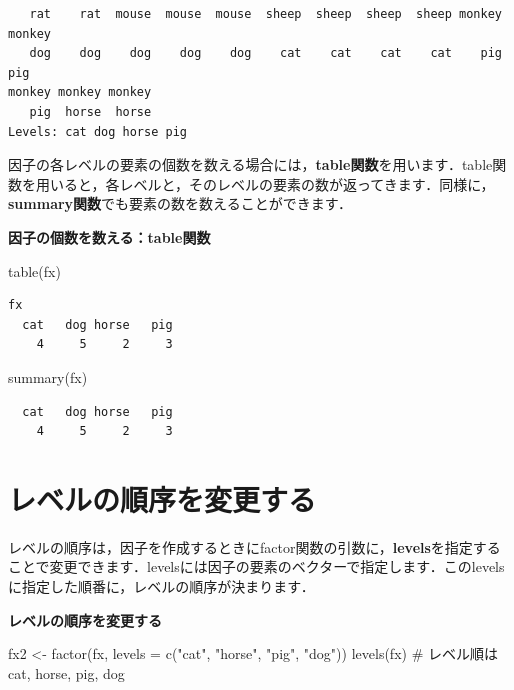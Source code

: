 \documentclass[
  letterpaper,
  DIV=11,
  numbers=noendperiod]{scrreprt}
\newenvironment{Shaded}{\begin{snugshade}}{\end{snugshade}}
\newcommand{\AttributeTok}[1]{\textcolor[rgb]{0.40,0.45,0.13}{#1}}
\newcommand{\CommentTok}[1]{\textcolor[rgb]{0.37,0.37,0.37}{#1}}
\newcommand{\FunctionTok}[1]{\textcolor[rgb]{0.28,0.35,0.67}{#1}}
\newcommand{\NormalTok}[1]{\textcolor[rgb]{0.00,0.23,0.31}{#1}}
\newcommand{\OtherTok}[1]{\textcolor[rgb]{0.00,0.23,0.31}{#1}}
\newcommand{\StringTok}[1]{\textcolor[rgb]{0.13,0.47,0.30}{#1}}
\begin{document}
\begin{verbatim}
   rat    rat  mouse  mouse  mouse  sheep  sheep  sheep  sheep monkey monkey 
   dog    dog    dog    dog    dog    cat    cat    cat    cat    pig    pig 
monkey monkey monkey 
   pig  horse  horse 
Levels: cat dog horse pig
\end{verbatim}

因子の各レベルの要素の個数を数える場合には，\textbf{table関数}を用います．table関数を用いると，各レベルと，そのレベルの要素の数が返ってきます．同様に，\textbf{summary関数}でも要素の数を数えることができます．

\textbf{因子の個数を数える：table関数}

\begin{Shaded}
\begin{Highlighting}[]
\FunctionTok{table}\NormalTok{(fx)}
\end{Highlighting}
\end{Shaded}

\begin{verbatim}
fx
  cat   dog horse   pig 
    4     5     2     3 
\end{verbatim}

\begin{Shaded}
\begin{Highlighting}[]
\FunctionTok{summary}\NormalTok{(fx)}
\end{Highlighting}
\end{Shaded}

\begin{verbatim}
  cat   dog horse   pig 
    4     5     2     3 
\end{verbatim}

\hypertarget{ux30ecux30d9ux30ebux306eux9806ux5e8fux3092ux5909ux66f4ux3059ux308b}{%
\section{レベルの順序を変更する}\label{ux30ecux30d9ux30ebux306eux9806ux5e8fux3092ux5909ux66f4ux3059ux308b}}

レベルの順序は，因子を作成するときにfactor関数の引数に，\textbf{levels}を指定することで変更できます．levelsには因子の要素のベクターで指定します．このlevelsに指定した順番に，レベルの順序が決まります．

\textbf{レベルの順序を変更する}

\begin{Shaded}
\begin{Highlighting}[]
\NormalTok{fx2 }\OtherTok{\textless{}{-}} \FunctionTok{factor}\NormalTok{(fx, }\AttributeTok{levels =} \FunctionTok{c}\NormalTok{(}\StringTok{"cat"}\NormalTok{, }\StringTok{"horse"}\NormalTok{, }\StringTok{"pig"}\NormalTok{, }\StringTok{"dog"}\NormalTok{))}
\FunctionTok{levels}\NormalTok{(fx) }\CommentTok{\# レベル順はcat, horse, pig, dog}
\end{Highlighting}
\end{Shaded}
\end{document}
